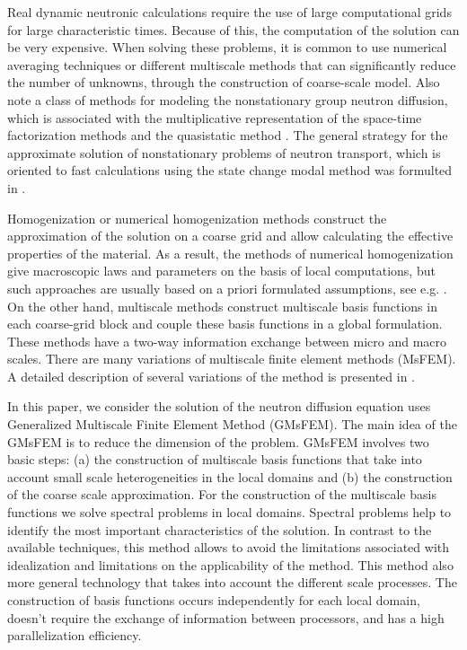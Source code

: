 \documentclass[runningheads]{llncs}
\begin{document}
Real dynamic neutronic calculations require the use of large computational grids for large characteristic times. 
Because of this, the computation of the solution can be very expensive.
When solving these problems, it is common to use numerical averaging techniques or different multiscale methods that can significantly reduce the number of unknowns, through the construction of coarse-scale model.
Also note a class of methods for modeling the nonstationary group neutron diffusion, which is associated with the multiplicative representation of the space-time factorization methods and the quasistatic method \cite{dulla2008quasi}. The general strategy for the approximate solution of nonstationary problems of neutron transport, which is oriented to fast calculations using the state change modal method was formulted in \cite{Progress18}.

Homogenization or numerical homogenization methods construct the approximation of the solution on a coarse grid and allow calculating the effective properties of the material.
As a result, the methods of numerical homogenization give macroscopic laws and parameters on the basis of local computations, but such approaches are usually based on a priori formulated assumptions, see e.g. \cite{Stalnov2017,Bakhvalov2012}. 
On the other hand, multiscale methods construct multiscale basis functions in each coarse-grid block and couple these basis functions in a global formulation. 
These methods have a two-way information exchange between micro and macro scales. 
There are many variations of multiscale finite element methods (MsFEM).
A detailed description of several variations of the method is presented in \cite{Efendiev2009}.

In this paper, we consider the solution of the neutron diffusion equation uses Generalized Multiscale Finite Element Method (GMsFEM). 
The main idea of the GMsFEM is to reduce the dimension of the problem. 
GMsFEM  involves two basic steps: (a) the construction of multiscale basis functions that take into account small scale heterogeneities in the local domains and (b) the construction of the coarse scale approximation. 
For the construction of the multiscale basis functions we solve spectral problems in local domains.
Spectral problems help to identify the most important characteristics of the solution. 
In contrast to the available techniques, this method allows to avoid the limitations associated with idealization and limitations on the applicability of the method.
This method also more general technology that takes into account the different scale processes.
The construction of basis functions occurs independently for each local domain, doesn't require the exchange of information between processors, and  has a high parallelization efficiency.
\end{document}
